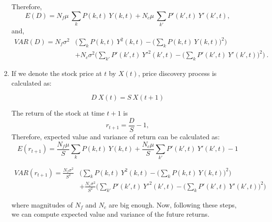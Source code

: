 \begin{enumerate}
{Therefore,
\begin{equation}
E(D) = N_f\mu\ \sum_{k}P(k,t)\ Y(k,t) + N_c\mu\ \sum_{k'}P'(k',t)\ Y'(k',t), 
\end{equation}
and,
\begin{equation}
\begin{split}
VAR(D) = N_f\sigma^2 & \Big(\sum_{k}P(k,t)\ Y^2(k,t)- \big(\sum_{k} P(k,t)\  Y(k,t)\big)^2 \Big) \\ & + N_c\sigma^2 \Big(\sum_{k'}P'(k',t)\ Y'^2(k',t)- \big(\sum_{k} P'(k',t)\ Y'(k',t)\big)^2 \Big) \  .
\end{split}
\end{equation}
}

\item {If we denote the stock price at $t$ by $X(t)$, price discovery process is calculated as:

\begin{equation}
D\ X(t) = S\ X(t + 1)
\end{equation}

The return of the stock at time $t + 1$ is
\begin{equation} 
r_{t+1} =\frac{D}{S}-1 ,
\end{equation}
Therefore, expected value and variance of return can be calculated as: 
\begin{equation} \label{exp_ret}
E(r_{t+1}) =\frac{N_{f}\mu}{S} \sum_{k}P(k,t)\ Y(k,t) +\frac{N_{c}\mu}{S} \sum_{k'}P'(k',t)\ Y'(k',t) - 1
\end{equation}

\begin{equation} \label{exp_var}
\begin{split}
VAR(r_{t+1}) =\frac{N_f\sigma^2}{S^2} & \Big(\sum_{k}P(k,t)\ Y^2(k,t)- \big(\sum_{k} P(k,t)\  Y(k,t)\big)^2 \Big) \\ & + \frac{N_c\sigma^2}{S^2} \Big(\sum_{k'}P'(k',t)\ Y'^2(k',t)- \big(\sum_{k} P'(k',t)\ Y'(k',t)\big)^2 \Big)
\end{split}
\end{equation}

where magnitudes of $N_{f}$ and $N_{c}$ are big enough. Now, following these steps, we can compute expected value and variance of the future returns. 
}

\end{enumerate}

